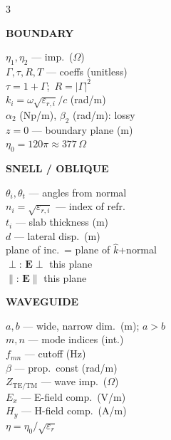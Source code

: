 \documentclass[6pt,letterpaper]{article}
\newcommand{\shead}[3]{%
  \noindent\colorbox{#1}{\parbox{\dimexpr\linewidth-2\fboxsep\relax}%
  {\color{#2}\bfseries\fontsize{6}{7}\selectfont #3}}\vspace{0.5pt}}
\begin{document}
\begin{multicols}{3}
\end{multicols}

\vfill
\vspace{1pt}
\noindent
\begin{minipage}[t]{0.19\linewidth}
\shead{purplebg}{purple}{BOUNDARY}
\begin{ebox}
$\eta_1,\eta_2$ --- imp.\ ($\Omega$)\\
$\Gamma,\tau,R,T$ --- coeffs (unitless)\\
$\tau\!=\!1\!+\!\Gamma$;\ $R\!=\!|\Gamma|^2$\\
$k_i\!=\!\omega\sqrt{\varepsilon_{r,i}}/c$ (rad/m)\\
$\alpha_2$ (Np/m), $\beta_2$ (rad/m): lossy\\
$z\!=\!0$ --- boundary plane (m)\\
$\eta_0\!=\!120\pi\!\approx\!377\,\Omega$
\end{ebox}
\end{minipage}\hfill
\begin{minipage}[t]{0.19\linewidth}
\shead{tealbg}{teal}{SNELL / OBLIQUE}
\begin{ebox}
$\theta_i,\theta_t$ --- angles from normal\\
$n_i=\sqrt{\varepsilon_{r,i}}$ --- index of refr.\\
$t_i$ --- slab thickness (m)\\
$d$ --- lateral disp.\ (m)\\
plane of inc.\ = plane of $\hat{k}$+normal\\
$\perp$: $\mathbf{E}\perp$ this plane\\
$\parallel$: $\mathbf{E}\parallel$ this plane
\end{ebox}
\end{minipage}\hfill
\begin{minipage}[t]{0.19\linewidth}
\shead{coralbg}{coral}{WAVEGUIDE}
\begin{ebox}
$a,b$ --- wide, narrow dim.\ (m); $a>b$\\
$m,n$ --- mode indices (int.)\\
$f_{mn}$ --- cutoff (Hz)\\
$\beta$ --- prop.\ const (rad/m)\\
$Z_{\text{TE/TM}}$ --- wave imp.\ ($\Omega$)\\
$E_x$ --- E-field comp.\ (V/m)\\
$H_y$ --- H-field comp.\ (A/m)\\
$\eta=\eta_0/\sqrt{\varepsilon_r}$
\end{ebox}
\end{minipage}\hfill
\end{document}
